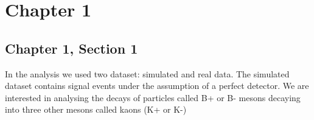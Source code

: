 \chapter{Chapter 1}\label{chap:01}

\section{Chapter 1, Section 1}

In the analysis we used two dataset: simulated and real data.
The simulated dataset contains signal events under the assumption of a perfect detector.
We are interested in analysing the decays of particles called B+ or B- mesons decaying into three other mesons called kaons (K+ or K-)
